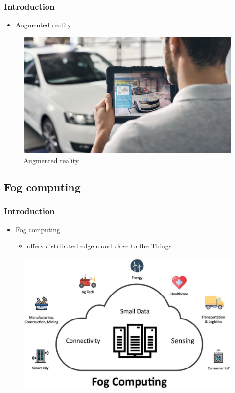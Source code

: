 \documentclass{beamer}
\begin{document}
\begin{frame}
\frametitle{Introduction}
\begin{itemize}
	\item Augmented reality
\end{itemize}	
\begin{figure}
	\centering
	\includegraphics[width=0.7\linewidth]{agmented_R}
	\caption{Augmented reality}
	\label{fig:agmentedr}
\end{figure}
\end{frame}
\subsection{Fog computing}
\begin{frame}
\frametitle{Introduction}
	\begin{itemize}
		\item Fog computing
		\begin{itemize}
			\item<1-> {offers distributed
				edge cloud close to the Things}
		\end{itemize}
	\end{itemize}
\begin{figure}
	\centering
	\includegraphics[width=0.7\linewidth]{fog-computing}
	\label{fig:fog-computing}
\end{figure}

\end{frame}
\end{document}
